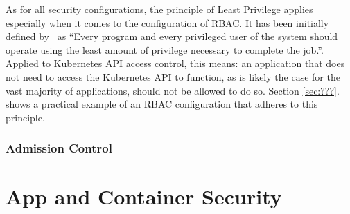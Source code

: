 As for all security configurations, the principle of Least Privilege applies especially when it comes to the configuration of RBAC. It has been initially defined by~\textcite{leastPrivilege} as \enquote{Every program and every privileged user of the system should operate using the least amount of privilege necessary to complete the job.}. Applied to Kubernetes API access control, this means: an application that does not need to access the Kubernetes API to function, as is likely the case for the vast majority of applications, should not be allowed to do so. Section \ref{sec:???}. shows a practical example of an RBAC configuration that adheres to this principle.



\subsubsection{Admission Control} \label{admissionControl}


\section{App and Container Security} \label{sec:layer4}

